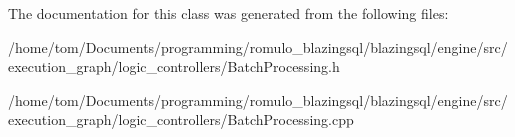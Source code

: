 The documentation for this class was generated from the following files\+:\begin{DoxyCompactItemize}
\item 
/home/tom/\+Documents/programming/romulo\+\_\+blazingsql/blazingsql/engine/src/execution\+\_\+graph/logic\+\_\+controllers/Batch\+Processing.\+h\item 
/home/tom/\+Documents/programming/romulo\+\_\+blazingsql/blazingsql/engine/src/execution\+\_\+graph/logic\+\_\+controllers/Batch\+Processing.\+cpp\end{DoxyCompactItemize}
